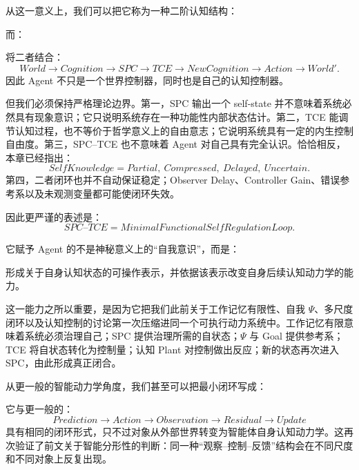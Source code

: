从这一意义上，我们可以把它称为一种二阶认知结构：
\begin{statementbox}
\centering
{}
\end{statementbox}
而：
\begin{statementbox}
\centering
{}
\end{statementbox}

将二者结合：
\begin{equation}
World
\rightarrow
Cognition
\rightarrow
SPC
\rightarrow
TCE
\rightarrow
NewCognition
\rightarrow
Action
\rightarrow
World'.
\end{equation}
因此 Agent 不只是一个世界控制器，同时也是自己的认知控制器。

但我们必须保持严格理论边界。第一，SPC 输出一个 self-state 并不意味着系统必然具有现象意识；它只说明系统存在一种功能性内部状态估计。第二，TCE 能调节认知过程，也不等价于哲学意义上的自由意志；它说明系统具有一定的内生控制自由度。第三，SPC--TCE 也不意味着 Agent 对自己具有完全认识。恰恰相反，本章已经指出：
\begin{equation}
SelfKnowledge
=
Partial,\ Compressed,\ Delayed,\ Uncertain.
\end{equation}
第四，二者闭环也并不自动保证稳定；Observer Delay、Controller Gain、错误参考系以及未观测变量都可能使闭环失效。

因此更严谨的表述是：
\begin{equation}
\boxed{
SPC\text{--}TCE
=
MinimalFunctionalSelfRegulationLoop.
}
\end{equation}

它赋予 Agent 的不是神秘意义上的``自我意识''，而是：
\begin{statementbox}
形成关于自身认知状态的可操作表示，并依据该表示改变自身后续认知动力学的能力。
\end{statementbox}

这一能力之所以重要，是因为它把我们此前关于工作记忆有限性、自我 $\Psi$、多尺度闭环以及认知控制的讨论第一次压缩进同一个可执行动力系统中。工作记忆有限意味着系统必须治理自己；SPC 提供治理所需的自状态；$\Psi$ 与 Goal 提供参考系；TCE 将自状态转化为控制量；认知 Plant 对控制做出反应；新的状态再次进入 SPC，由此形成真正闭合。

从更一般的智能动力学角度，我们甚至可以把最小闭环写成：
\begin{statementbox}
\centering
{}
\end{statementbox}
它与更一般的：
\begin{equation}
Prediction
\rightarrow
Action
\rightarrow
Observation
\rightarrow
Residual
\rightarrow
Update
\end{equation}
具有相同的闭环形式，只不过对象从外部世界转变为智能体自身认知动力学。这再次验证了前文关于智能分形性的判断：同一种``观察--控制--反馈''结构会在不同尺度和不同对象上反复出现。

